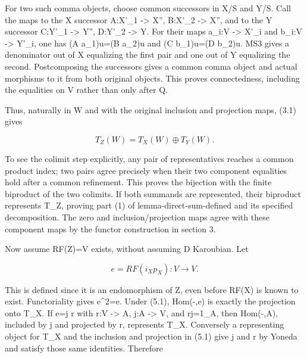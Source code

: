 \documentclass[11pt]{article}
\begin{document}
For two such comma objects,\allowbreak{} choose common successors in X/\allowbreak{}S and Y/\allowbreak{}S. Call the maps to the X successor A:\allowbreak{}X'\_\allowbreak{}1 \allowbreak{}-> X'',\allowbreak{} B:\allowbreak{}X'\_\allowbreak{}2 \allowbreak{}-> X'',\allowbreak{} and to the Y successor C:\allowbreak{}Y'\_\allowbreak{}1 \allowbreak{}-> Y'',\allowbreak{} D:\allowbreak{}Y'\_\allowbreak{}2 \allowbreak{}-> Y\textquotesingle\textquotesingle. For their maps a\_\allowbreak{}i:\allowbreak{}V \allowbreak{}-> X'\_\allowbreak{}i and b\_\allowbreak{}i:\allowbreak{}V \allowbreak{}-> Y'\_\allowbreak{}i,\allowbreak{} one has (A a\_\allowbreak{}1)\allowbreak{}u\allowbreak{}=(B a\_\allowbreak{}2)\allowbreak{}u and (C b\_\allowbreak{}1)\allowbreak{}u\allowbreak{}=(D b\_\allowbreak{}2)\allowbreak{}u. MS3 gives a denominator out of X\textquotesingle\textquotesingle{} equalizing the first pair and one out of Y\textquotesingle\textquotesingle{} equalizing the second. Postcomposing the successors gives a common comma object and actual morphisms to it from both original objects. This proves connectedness,\allowbreak{} including the equalities on V rather than only after Q.

Thus,\allowbreak{} naturally in W and with the original inclusion and projection maps,\allowbreak{} (3.1)\allowbreak{} gives

\[
 T_Z(W)=T_X(W)\oplus T_Y(W).                              \tag{5.1}
\]

To see the colimit step explicitly,\allowbreak{} any pair of representatives reaches a common product index; two pairs agree precisely when their two component equalities hold after a common refinement. This proves the bijection with the finite biproduct of the two colimits. If both summands are represented,\allowbreak{} their biproduct represents T\_\allowbreak{}Z,\allowbreak{} proving part (1)\allowbreak{} of lemma-direct-sum-defined and its specified decomposition. The zero and inclusion/\allowbreak{}projection maps agree with these component maps by the functor construction in section 3.

Now assume RF(Z)\allowbreak{}\allowbreak{}=V exists,\allowbreak{} without assuming D\textquotesingle{} Karoubian. Let

\[
 e=RF(i_Xp_X):V\longrightarrow V.
\]

This is defined since it is an endomorphism of Z,\allowbreak{} even before RF(X)\allowbreak{} is known to exist. Functoriality gives e\textasciicircum{}2\allowbreak{}=e. Under (5.1)\allowbreak{},\allowbreak{} Hom(-,\allowbreak{}e)\allowbreak{} is exactly the projection onto T\_\allowbreak{}X. If e\allowbreak{}=j r with r:\allowbreak{}V \allowbreak{}-> A,\allowbreak{} j:\allowbreak{}A \allowbreak{}-> V,\allowbreak{} and rj\allowbreak{}=1\_\allowbreak{}A,\allowbreak{} then Hom(-,\allowbreak{}A)\allowbreak{},\allowbreak{} included by j and projected by r,\allowbreak{} represents T\_\allowbreak{}X. Conversely a representing object for T\_\allowbreak{}X and the inclusion and projection in (5.1)\allowbreak{} give j and r by Yoneda and satisfy those same identities. Therefore
\end{document}
